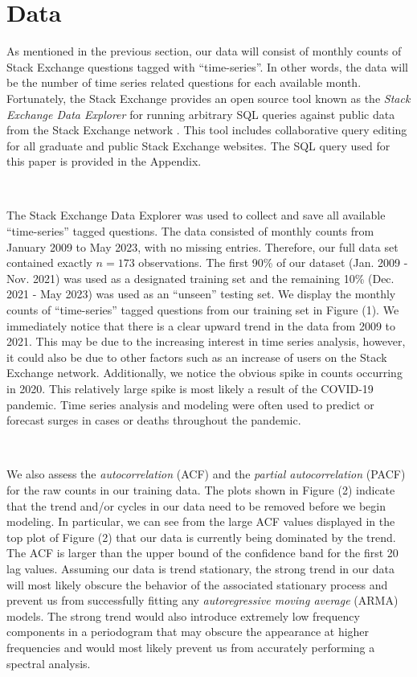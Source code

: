 \documentclass[10pt]{article}
\begin{document}
\section*{Data}

As mentioned in the previous section, our data will consist of monthly counts of Stack Exchange questions tagged with ``time-series''. In other words, the data will be the number of time series related questions for each available month. Fortunately, the Stack Exchange provides an open source tool known as the \textit{Stack Exchange Data Explorer} for running arbitrary SQL queries against public data from the Stack Exchange network \cite{stex_de}. This tool includes collaborative query editing for all graduate and public Stack Exchange websites. The SQL query used for this paper is provided in the Appendix.

\

The Stack Exchange Data Explorer was used to collect and save all available ``time-series'' tagged questions. The data consisted of monthly counts from January 2009 to May 2023, with no missing entries. Therefore, our full data set contained exactly $n=173$ observations. The first 90\% of our dataset (Jan. 2009 - Nov. 2021) was used as a designated training set and the remaining 10\% (Dec. 2021 - May 2023) was used as an ``unseen'' testing set. We display the monthly counts of ``time-series'' tagged questions from our training set in Figure (1). We immediately notice that there is a clear upward trend in the data from 2009 to 2021. This may be due to the increasing interest in time series analysis, however, it could also be due to other factors such as an increase of users on the Stack Exchange network. Additionally, we notice the obvious spike in counts occurring in 2020. This relatively large spike is most likely a result of the COVID-19 pandemic. Time series analysis and modeling were often used to predict or forecast surges in cases or deaths throughout the pandemic.

\

We also assess the \textit{autocorrelation} (ACF) and the \textit{partial autocorrelation} (PACF) for the raw counts in our training data. The plots shown in Figure (2) indicate that the trend and/or cycles in our data need to be removed before we begin modeling. In particular, we can see from the large ACF values displayed in the top plot of Figure (2) that our data is currently being dominated by the trend. The ACF is larger than the upper bound of the confidence band for the first 20 lag values. Assuming our data is trend stationary, the strong trend in our data will most likely obscure the behavior of the associated stationary process and prevent us from successfully fitting any \textit{autoregressive moving average} (ARMA) models. The strong trend would also introduce extremely low frequency components in a periodogram that may obscure the appearance at higher frequencies and would most likely prevent us from accurately performing a spectral analysis.
\end{document}
